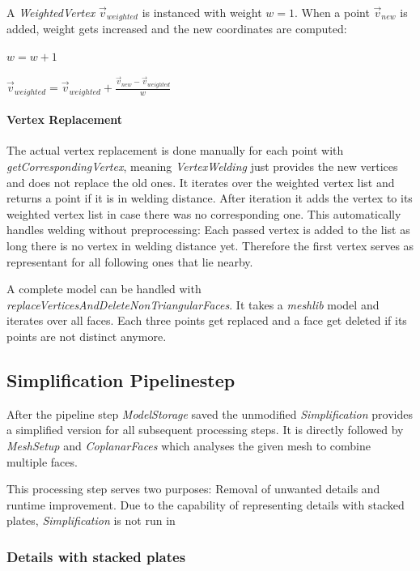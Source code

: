 \documentclass[../ClassicThesis.tex]{subfiles}
\begin{document}
A \emph{WeightedVertex} $\vec{v}_{weighted}$ is instanced with weight $w = 1$. When a point $\vec{v}_{new}$ is added, weight gets increased and the new coordinates are computed:

$ w = w + 1 $

$ \vec{v}_{weighted} = \vec{v}_{weighted} + \frac{\vec{v}_{new} - \vec{v}_{weighted}}{w}$


\paragraph{Vertex Replacement}

The actual vertex replacement is done manually for each point with \emph{getCorrespondingVertex}, meaning \emph{VertexWelding} just provides the new vertices and does not replace the old ones. It iterates over the weighted vertex list and returns a point if it is in welding distance. After iteration it adds the vertex to its weighted vertex list in case there was no corresponding one. This automatically handles welding without preprocessing: Each passed vertex is added to the list as long there is no vertex in welding distance yet. Therefore the first vertex serves as representant for all following ones that lie nearby.

A complete model can be handled with \emph{replaceVerticesAndDeleteNonTriangularFaces}. It takes a \emph{meshlib} model and iterates over all faces. Each three points get replaced and a face get deleted if its points are not distinct anymore. 




\subsection{Simplification Pipelinestep}

After the pipeline step \emph{ModelStorage} saved the unmodified {\threedmodel} \emph{Simplification} provides a simplified version for all subsequent processing steps. It is directly followed by \emph{MeshSetup} and \emph{CoplanarFaces} which analyses the given mesh to combine multiple faces. 

This processing step serves two purposes: Removal of unwanted details and runtime improvement. Due to the capability of representing details with stacked plates, \emph{Simplification} is not run in 

\subsubsection{Details with stacked plates}
\end{document}
